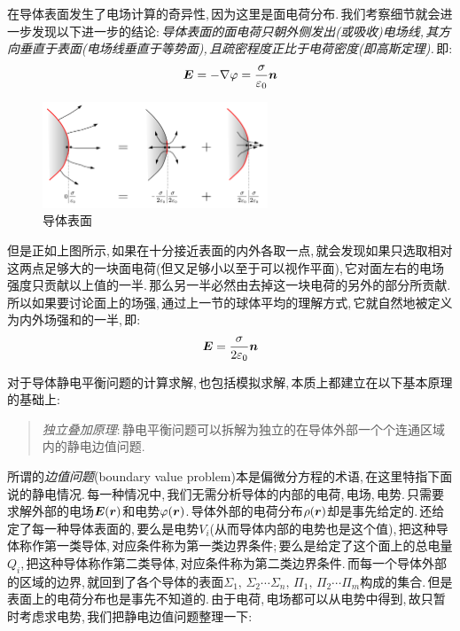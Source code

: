 在导体表面发生了电场计算的奇异性,\,因为这里是面电荷分布.\,我们考察细节就会进一步发现以下进一步的结论:\,\emph{导体表面的面电荷只朝外侧发出(或吸收)电场线,\,其方向垂直于表面(电场线垂直于等势面),\,且疏密程度正比于电荷密度(即高斯定理).}\,即:
\[\boldsymbol{E}=-\nabla\varphi=\frac{\sigma}{\varepsilon_0}\boldsymbol{n}\]

\begin{figure}[H]
\centering
\includegraphics[width=0.6\textwidth]{image/7-2-3.png}
\caption{导体表面}
\end{figure}

但是正如上图所示,\,如果在十分接近表面的内外各取一点,\,就会发现如果只选取相对这两点足够大的一块面电荷(但又足够小以至于可以视作平面),\,它对面左右的电场强度只贡献以上值的一半.\,那么另一半必然由去掉这一块电荷的另外的部分所贡献.\,所以如果要讨论面上的场强,\,通过上一节的球体平均的理解方式,\,它就自然地被定义为内外场强和的一半,\,即:
\[\boldsymbol{E}=\frac{\sigma}{2\varepsilon_0}\boldsymbol{n}\]

对于导体静电平衡问题的计算求解,\,也包括模拟求解,\,本质上都建立在以下基本原理的基础上:

\begin{verse}
\emph{独立叠加原理}:\,静电平衡问题可以拆解为独立的在导体外部一个个连通区域内的静电边值问题.
\end{verse}

所谓的\emph{边值问题}(boundary value problem)本是偏微分方程的术语,\,在这里特指下面说的静电情况.\,每一种情况中,\,我们无需分析导体的内部的电荷,\,电场,\,电势.\,只需要求解外部的电场$\boldsymbol{E}(\boldsymbol{r})$和电势$\varphi(\boldsymbol{r})$.\,导体外部的电荷分布$\rho(\boldsymbol{r})$却是事先给定的.\,还给定了每一种导体表面的,\,要么是电势$V_i$(从而导体内部的电势也是这个值),\,把这种导体称作第一类导体,\,对应条件称为第一类边界条件;\,要么是给定了这个面上的总电量$Q_i$,\,把这种导体称作第二类导体,\,对应条件称为第二类边界条件.\,而每一个导体外部的区域的边界,\,就回到了各个导体的表面$\Sigma_1,\,\Sigma_2\cdots\Sigma_n,\,\Pi_1,\,\Pi_2\cdots\Pi_m$构成的集合.\,但是表面上的电荷分布也是事先不知道的.\,由于电荷,\,电场都可以从电势中得到,\,故只暂时考虑求电势,\,我们把静电边值问题整理一下:

